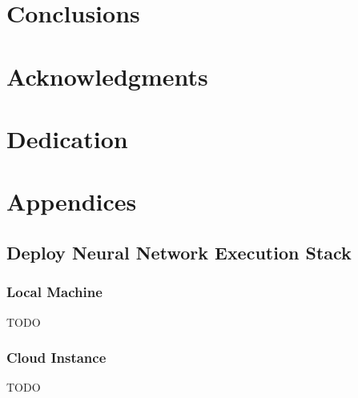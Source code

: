 \chapter{Conclusions}\label{conclusions}

\chapter{Acknowledgments}\label{acknowledgments}

\chapter{Dedication}\label{dedication}

\chapter{Appendices}\label{appendices}

\section{Deploy Neural Network Execution
Stack}\label{deploy-neural-network-execution-stack}

\subsection{Local Machine}\label{local-machine}

TODO

\subsection{Cloud Instance}\label{cloud-instance}

TODO
